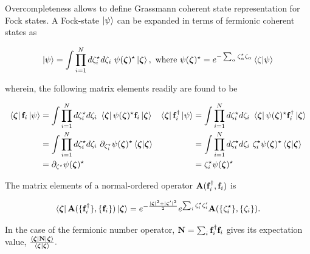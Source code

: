 \documentclass{homework}
\begin{document}
Overcompleteness allows to define Grassmann coherent state representation for Fock states. A Fock-state $\ket{\psi}$ can be expanded in terms of fermionic coherent states as 

$$
\ket{\psi} = \int \prod_{i=1}^{N} d{\zeta}^\star_i d\zeta_i \textnormal{ } \psi({\bm \zeta)^\star} \ket{\bm{\zeta}}, \textnormal{ where } \psi({\bm \zeta)^\star} = e^{- \sum_{\alpha} \zeta^\star_{\alpha} \zeta_\alpha} \bra{\zeta}\ket{\psi} 
$$

wherein, the following matrix elements readily are found to be 

\begin{equation}
\begin{array}{cc}
    \begin{split}
        \bra{\bm{\zeta}} {{\bf f}}_i \ket{\psi} &= \int \prod_{i=1}^{N} d{\zeta}^\star_i d\zeta_i \textnormal{ } \bra{\bm{\zeta}} \psi({\bm \zeta)^\star} {{\bf f}}_i \ket{\bm{\zeta}} \\
        &= \int \prod_{i=1}^{N} d{\zeta}^\star_i d\zeta_i \textnormal{ } \partial_{\zeta_i^\star} \psi({\bm \zeta)^\star} \bra{\bm{\zeta}}\ket{\bm{\zeta}} \\
        &= \partial_{{\zeta^\star}}\psi({\bm \zeta)^\star}
    \end{split} & \begin{split}
         \bra{\bm{\zeta}} {{\bf f}}_i^\dagger \ket{\psi} &= \int \prod_{i=1}^{N} d{\zeta}^\star_i d\zeta_i \textnormal{ } \bra{\bm{\zeta}} \psi({\bm \zeta)^\star} {{\bf f}}_i^\dagger \ket{\bm{\zeta}} \\
        &= \int \prod_{i=1}^{N} d{\zeta}^\star_i d\zeta_i \textnormal{ } {\zeta_i^\star} \psi({\bm \zeta)^\star} \bra{\bm{\zeta}}\ket{\bm{\zeta}} \\
        &= {\zeta_i^\star} \psi({\bm \zeta)^\star}
    \end{split}  \\
   \end{array}  
\end{equation}
   
The matrix elements of a normal-ordered operator ${\bf A}({{{\bf f}}_i^\dagger
}, {{\bf f}}_i)$ is 

$$
\bra{\bm{\zeta}} {{\bf A}}(\{{{\bf f}}_i^\dagger
\}, \{{\bf f}_i\}) \ket{\bm{\zeta}} = e^{-\frac{|\bm{\zeta}|^2 + |\bm{\zeta}'|^2}{2}} e^{\sum_{i} \zeta_i^\star \zeta_i'} {{\bf A}}(\{\zeta_i^\star\}, \{\zeta_i\}).
$$

In the case of the fermionic number operator, ${{\bf N}} = \sum_{i} {{\bf f}}_i^\dagger {{\bf f}}_i$ gives its expectation value, 
$
\frac{\bra{\bm{\zeta}} {{\bf N}} \ket{\bm{\zeta}}}{\bra{\bm{\zeta}} \ket{\bm{\zeta}}}.
$
\end{document}
